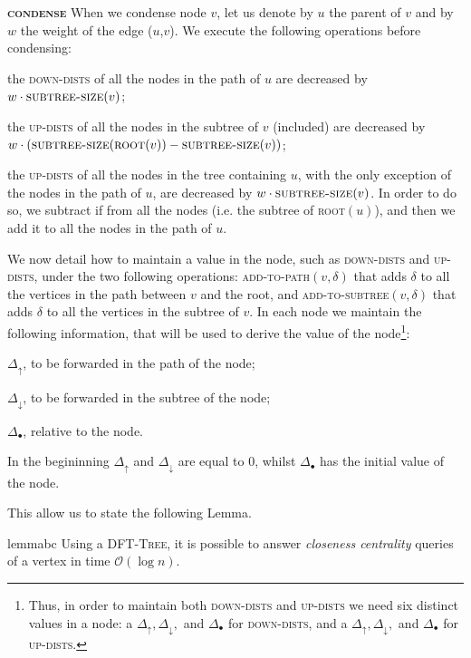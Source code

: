 \documentclass[a4paper,USenglish]{lipics}
\newcommand{\bigoh}{\mathcal{O}}
\newcommand{\dft}{\textsc{DFT-Tree}}
\begin{document}
\noindent	\textbf{\textsc{condense}}
When we condense node $v$, let us denote by $u$ the parent of $v$ and by $w$ the weight of the edge ($u$,$v$). We execute the following operations before condensing:
\begin{compactitem}
\item the \textsc{down-dists} of all the nodes in the path of $u$ are decreased by $w\cdot\textsc{subtree-size}(v)$;
\item the \textsc{up-dists} of all the nodes in the subtree of $v$ (included) are decreased by $w\cdot(\textsc{subtree-size}(\textsc{root}(v)) - \textsc{subtree-size}(v))$;
\item the \textsc{up-dists} of all the nodes in the tree containing $u$, with the only exception of the nodes in the path of $u$, are decreased by $w\cdot\textsc{subtree-size}(v)$. In order to do so, we subtract if from all the nodes (i.e. the subtree of \textsc{root}$(u)$), and then we add it to all the nodes in the path of $u$. 
\end{compactitem}


We now detail how to maintain a value in the node, such as \textsc{down-dists} and \textsc{up-dists}, under the two following operations: \textsc{add-to-path}$(v,\delta)$ that adds $\delta$ to all the vertices in the path between $v$ and the root, and \textsc{add-to-subtree}$(v,\delta)$ that adds $\delta$ to all the vertices in the subtree of $v$. 
In each node we 	maintain the following information, that will be used to derive the value of the node\footnote{Thus, in order to maintain both \textsc{down-dists} and \textsc{up-dists} we need six distinct values in a node: a $\Delta_\uparrow, \Delta_\downarrow,$ and  $\Delta_\bullet$ for \textsc{down-dists}, and a $\Delta_\uparrow, \Delta_\downarrow,$ and  $\Delta_\bullet$ for \textsc{up-dists}.}:
\begin{compactitem}
				\item $\Delta_\uparrow$, to be forwarded in the path of the node;
				\item $\Delta_\downarrow$, to be forwarded in the subtree of the node;
				\item $\Delta_\bullet$, relative to the node.
			\end{compactitem}
	

In the begininning $\Delta_\uparrow$ and $\Delta_\downarrow$ are equal to $0$, whilst $\Delta_\bullet$ has the initial value of the node.

This allow us to state the following Lemma.
\begin{restatable}{lemma}{bc}
Using a \dft, it is possible to answer \emph{closeness centrality} queries of a vertex in time $\bigoh (\log n)$.
\end{restatable}
\end{document}
